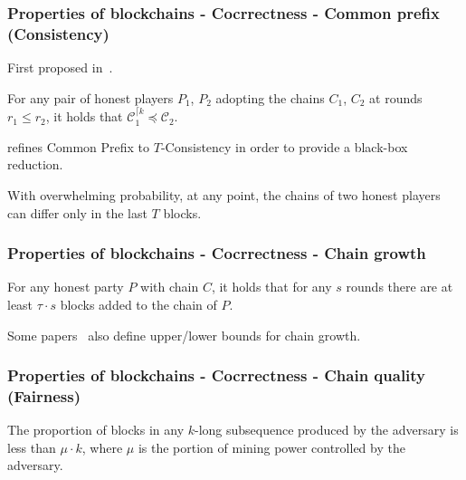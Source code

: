 \documentclass{beamer}
\begin{document}
\begin{frame}
\frametitle{Properties of blockchains - Cocrrectness - Common prefix (Consistency)}

First proposed in~\cite{garay2015bitcoin}.

\begin{definition}
For any pair of honest players $P_1$, $P_2$ adopting the chains $C_1$, $C_2$ at rounds $r_1 \leq r_2$, it holds that $\mathcal{C}_{1}^{\lceil k} \preceq \mathcal{C}_2$.
\end{definition}

\cite{pass2017analysis} refines Common Prefix to $T$-Consistency in order to provide a black-box reduction.

\begin{definition}[$T$-consistency]
With overwhelming probability, at any point, the chains of two honest players can differ only in the last $T$ blocks.
\end{definition}


\end{frame}

\begin{frame}
\frametitle{Properties of blockchains - Cocrrectness - Chain growth}

\begin{definition}
For any honest party $P$ with chain $C$, it holds that for any $s$ rounds there are at least $\tau \cdot s$ blocks added to the chain of $P$.
\end{definition}

Some papers~\cite{rocket2018snowflake}\cite{pass2017sleepy} also define upper/lower bounds for chain growth.


\end{frame}


\begin{frame}
\frametitle{Properties of blockchains - Cocrrectness - Chain quality (Fairness)}
    
\begin{definition}
The proportion of blocks in any $k$-long subsequence produced by the adversary is less than $\mu \cdot k$, where $\mu$ is the portion of mining power controlled by the adversary.
\end{definition}

\end{frame}
\end{document}
